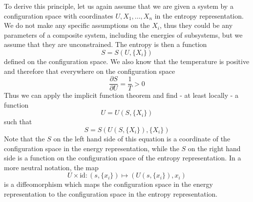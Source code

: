\documentclass[a4paper, draft]{article}
\theoremstyle{own}
\theoremstyle{remark}
\begin{document}
To derive this principle, let us again assume that we are given a system by a configuration space with coordinates $U, X_1, \dots, X_n$ in the entropy representation. We do not make any specific assumptions on the $X_i$, thus they could be any parameters of a composite system, including the energies of subsystems, but we assume that they are unconstrained. The entropy is then a function
$$
S = S(U, \{ X_i \})
$$
defined on the configuration space. We also know that the temperature is positive and therefore that everywhere on the configuration space
$$
\frac{\partial S}{\partial U} = \frac{1}{T} > 0
$$
Thus we can apply the implicit function theorem and find - at least locally - a function 
$$
U = U(S, \{ X_i \})
$$
such that
$$
S = S(U(S,\{ X_i \}), \{ X_i \})
$$
Note that the $S$ on the left hand side of this equation is a coordinate of the configuration space in the energy representation, while the $S$ on the right hand side is a function on the configuration space of the entropy representation. In a more neutral notation, the map
$$
U \times \text{id} \colon (s,\{ x_i \} ) \mapsto (U(s, \{ x_i \}), x_i)
$$
is a diffeomorphism which maps the configuration space in the energy representation to the configuration space in the entropy representation.
\end{document}
